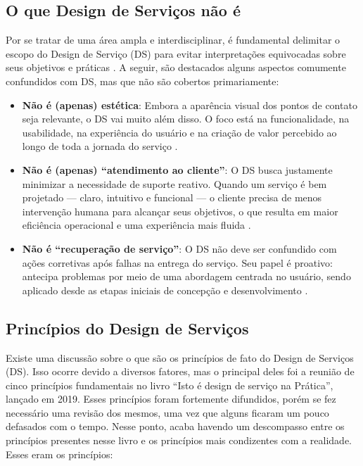 \subsection{O que Design de Serviços não é}

Por se tratar de uma área ampla e interdisciplinar, é fundamental delimitar o escopo do Design de Serviço (DS) para evitar interpretações equivocadas sobre seus objetivos e práticas \cite{Polaine2013Orange}. A seguir, são destacados alguns aspectos comumente confundidos com DS, mas que não  são cobertos primariamente:

\begin{itemize}
	\item \textbf{Não é (apenas) estética}:  Embora a aparência visual dos pontos de contato seja relevante, o DS vai muito além disso. O foco está na funcionalidade, na usabilidade, na experiência do usuário e na criação de valor percebido ao longo de toda a jornada do serviço \cite{Polaine2013Orange}.
	
	\item \textbf{Não é (apenas) ``atendimento ao cliente''}: O DS busca justamente minimizar a necessidade de suporte reativo. Quando um serviço é bem projetado — claro, intuitivo e funcional — o cliente precisa de menos intervenção humana para alcançar seus objetivos, o que resulta em maior eficiência operacional e uma experiência mais fluida \cite{Stickdorn2019}.
	
	\item \textbf{Não é ``recuperação de serviço''}: O DS não deve ser confundido com ações corretivas após falhas na entrega do serviço. Seu papel é proativo: antecipa problemas por meio de uma abordagem centrada no usuário, sendo aplicado desde as etapas iniciais de concepção e desenvolvimento \cite{Patricio2011Multilevel}.
\end{itemize}


\subsection{Princípios do Design de Serviços}

Existe uma discussão sobre o que são os princípios de fato do Design de Serviços (DS). Isso ocorre devido a diversos fatores, mas o principal deles foi a reunião de cinco princípios fundamentais no livro ``Isto é design de serviço na Prática'', lançado em 2019. Esses princípios foram fortemente difundidos, porém se fez necessário uma revisão dos mesmos, uma vez que alguns ficaram um pouco defasados com o tempo. Nesse ponto, acaba havendo um descompasso entre os princípios presentes nesse livro e os princípios mais condizentes com a realidade. Esses eram os princípios:

